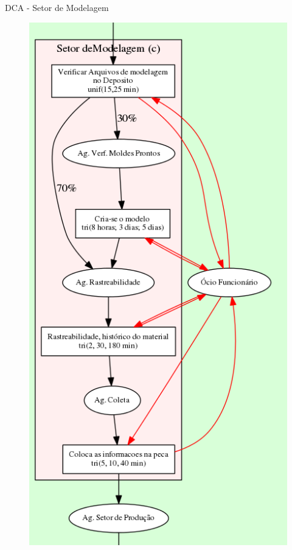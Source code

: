 \documentclass[xcolor=dvipsnames]{beamer}
\begin{document}
\begin{frame}{DCA - Setor de Modelagem}
	\begin{figure}[H]
		\centering
		\includegraphics[height=0.865\textheight]{img/c.png}
	\end{figure}
\end{frame}
	
\end{document}
